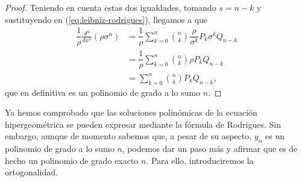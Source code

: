 \begin{proof}
    Teniendo en cuenta estas dos igualdades, tomando $s=n-k$ y sustituyendo en (\ref{eq:leibniz-rodrigues}), llegamos a que 
    \begin{equation}
        \begin{split}
            \dfrac 1 \rho \frac{d^n }{d x^n}(\rho \sigma^n) &= \dfrac 1 \rho  \sum_{k=0}^n \binom{n}{k}  \dfrac\rho{\sigma^k} P_k \sigma^{k} Q_{n-k} \\
            &= \dfrac 1 \rho \sum_{k=0}^n \binom{n}{k} \rho P_k Q_{n-k} \\
            &= \sum_{k=0}^n \binom{n}{k} P_k Q_{n-k},
        \end{split}
    \end{equation}
    que en definitiva es un polinomio de grado a lo sumo $n$.

\end{proof}

Ya hemos comprobado que las soluciones polinómicas de la ecuación hipergeométrica se pueden expresar mediante la fórmula de Rodrigues. Sin embargo, aunque de momento sabemos que, a pesar de su aspecto, $y_n$ es un polinomio de grado a lo sumo $n$, podemos dar un paso más y afirmar que es de hecho un polinomio de grado exacto $n$. Para ello, introduciremos la ortogonalidad.


